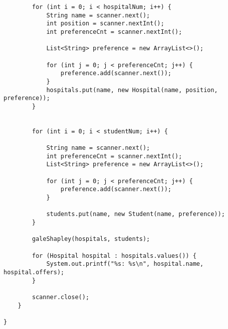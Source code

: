 \documentclass[14pt, a4paper]{article}
\begin{document}
\begin{verbatim}
        for (int i = 0; i < hospitalNum; i++) {
            String name = scanner.next();
            int position = scanner.nextInt();
            int preferenceCnt = scanner.nextInt();

            List<String> preference = new ArrayList<>();

            for (int j = 0; j < preferenceCnt; j++) {
                preference.add(scanner.next());
            }
            hospitals.put(name, new Hospital(name, position, preference));
        }


        for (int i = 0; i < studentNum; i++) {

            String name = scanner.next();
            int preferenceCnt = scanner.nextInt();
            List<String> preference = new ArrayList<>();

            for (int j = 0; j < preferenceCnt; j++) {
                preference.add(scanner.next());
            }

            students.put(name, new Student(name, preference));
        }

        galeShapley(hospitals, students);

        for (Hospital hospital : hospitals.values()) {
            System.out.printf("%s: %s\n", hospital.name, hospital.offers);
        }

        scanner.close();
    }

}
\end{verbatim}
\end{document}
